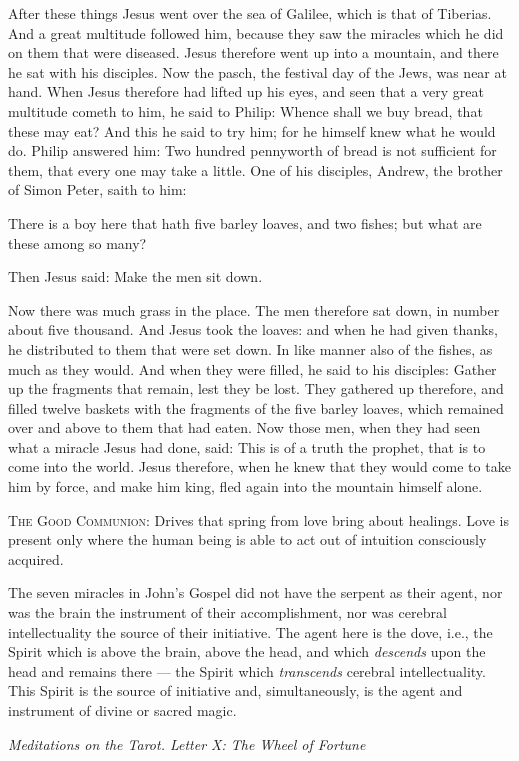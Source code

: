 \begin{multicols}{2}\small
After these things Jesus went over the sea of Galilee, which is that of Tiberias. And a great multitude followed him,
because they saw the miracles which he did on them that were diseased. Jesus therefore went up into a mountain, and
there he sat with his disciples. Now the pasch, the festival day of the Jews, was near at hand. When Jesus therefore
had lifted up his eyes, and seen that a very great multitude cometh to him, he said to Philip: Whence shall we buy
bread, that these may eat? And this he said to try him; for he himself knew what he would do. Philip answered him: Two
hundred pennyworth of bread is not sufficient for them, that every one may take a little. One of his disciples, Andrew,
the brother of Simon Peter, saith to him:

There is a boy here that hath five barley loaves, and two fishes; but what are these among so many?

Then Jesus said: Make the men sit down.

Now there was much grass in the place. The men therefore sat down, in number about five thousand. And Jesus took the
loaves: and when he had given thanks, he distributed to them that were set down. In like manner also of the fishes, as
much as they would. And when they were filled, he said to his disciples: Gather up the fragments that remain, lest they
be lost. They gathered up therefore, and filled twelve baskets with the fragments of the five barley loaves, which
remained over and above to them that had eaten. Now those men, when they had seen what a miracle Jesus had done, said:
This is of a truth the prophet, that is to come into the world. Jesus therefore, when he knew that they would come to
take him by force, and make him king, fled again into the mountain himself alone. 
\end{multicols}

\textsc{The Good Communion}:
Drives that spring from love bring about healings. Love is present only where the human being is able to act out of
intuition consciously acquired.

\begin{quotationx}
The seven miracles in John's Gospel did not have the serpent as their agent, nor was the brain the
instrument of their accomplishment, nor was cerebral intellectuality the source of their initiative. The agent here is
the dove, i.e., the Spirit which is above the brain, above the head, and which \emph{descends} upon the head and
remains there — the Spirit which \emph{transcends} cerebral intellectuality. This Spirit is the
source of initiative and, simultaneously, is the agent and instrument of divine or sacred magic. \begin{flushright} \emph{Meditations
on the Tarot. Letter X: The Wheel of Fortune}\end{flushright}

\end{quotationx}

